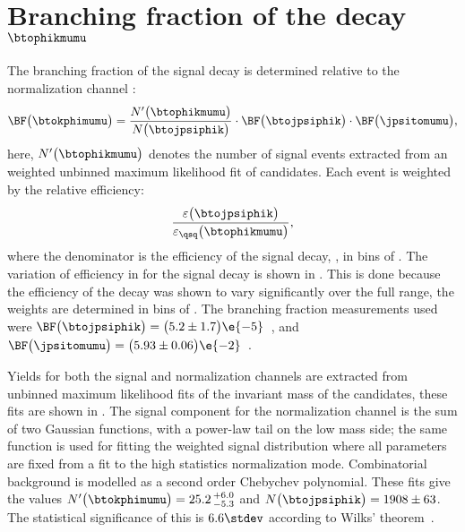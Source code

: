 \section[Branching fraction of the decay \btophikmumu]
{Branching fraction of the decay $\boldsymbol{\btophikmumu}$}

The branching fraction of the signal decay \btophikmumu is determined relative to the normalization
channel \btojpsiphik:
\begin{equation}
  \BF\big(\btokphimumu\big)=
  \frac{ N^\prime\big(\btophikmumu\big) }{ N\big(\btojpsiphik\big) }
  \cdot\BF\big(\btojpsiphik\big)
  \cdot\BF\big(\jpsitomumu\big),
\end{equation}
here, $N^\prime\big(\btophikmumu\big)$ denotes the number of signal events extracted from an
weighted unbinned maximum likelihood fit of \btophikmumu candidates.
Each event is weighted by the relative efficiency:
\begin{equation}
  \frac{\varepsilon\big(\btojpsiphik\big)}{\varepsilon_{\qsq}\big(\btophikmumu\big)},
\end{equation}
where the denominator is the efficiency of the signal decay, \btophikmumu, in bins of \qsq.
The variation of efficiency in \qsq for the signal decay is shown in
.
This is done because the efficiency of the decay \btophikmumu was shown to vary significantly over
the full \qsq range, the weights are determined in bins of \qsq.
The branching fraction measurements used were
$\BF\big(\btojpsiphik\big)=\big(5.2\pm1.7\big)\e{-5}$~\cite{PDG2012},
and $\BF\big(\jpsitomumu\big)=\big(5.93\pm0.06\big)\e{-2}$~\cite{PDG2012}.

Yields for both the signal and normalization channels are extracted from unbinned maximum
likelihood fits of the invariant mass of the \Bp candidates, these fits are shown in
.
The signal component for the normalization channel is the sum of two Gaussian functions, with a
power-law tail on the low mass side; the same function is used for fitting the weighted signal
distribution where all parameters are fixed from a fit to the high statistics normalization mode.
Combinatorial background is modelled as a second order Chebychev polynomial.
These fits give the values
$N^\prime\big(\btokphimumu\big)=25.2\,^{+6.0}_{-5.3}$ and
$N\big(\btojpsiphik\big)=1908\pm63$.
The statistical significance of this is $6.6\stdev$ according to Wilks' theorem~\cite{wilks1938}.

